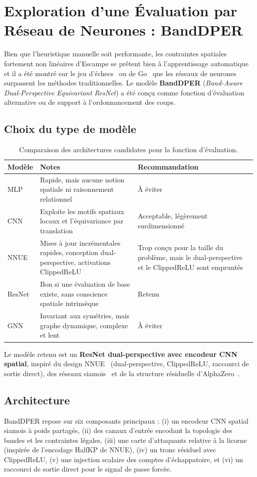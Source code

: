 \documentclass[12pt,a4paper]{article}
\begin{document}
\section{Exploration d'une Évaluation par Réseau de Neurones : BandDPER}
Bien que l'heuristique manuelle soit performante, les contraintes spatiales fortement non linéaires d'Escampe se prêtent bien à l'apprentissage automatique et il a été montré sur le jeu d'échecs~\cite{cp_nnue} ou de Go~\cite{alphazero} que les réseaux de neurones surpassent les méthodes traditionnelles.
Le modèle \textbf{BandDPER} (\textit{Band-Aware Dual-Perspective Equivariant ResNet}) a été conçu comme fonction d'évaluation alternative ou de support à l'ordonnancement des coups.


\subsection*{Choix du type de modèle}
\begin{table}[H]
\centering
\begin{tabular}{p{1.8cm} p{6.5cm} p{4.5cm}}
\toprule
Modèle & Notes & Recommandation \\
\midrule
MLP & Rapide, mais aucune notion spatiale ni raisonnement relationnel & À éviter \\
CNN & Exploite les motifs spatiaux locaux et l'équivariance par translation & Acceptable, légèrement surdimensionné \\
NNUE & Mises à jour incrémentales rapides, conception dual-perspective, activations ClippedReLU & Trop conçu pour la taille du problème, mais le dual-perspective et le ClippedReLU sont empruntés \\
ResNet & Bon si une évaluation de base existe, sans conscience spatiale intrinsèque & Retenu \\
GNN & Invariant aux symétries, mais graphe dynamique, complexe et lent & À éviter \\
\bottomrule
\end{tabular}
\caption{Comparaison des architectures candidates pour la fonction d'évaluation.}
\label{tab-existing-models}
\end{table}

Le modèle retenu est un \textbf{ResNet dual-perspective avec encodeur CNN spatial}, inspiré du design NNUE~\cite{cp_nnue} (dual-perspective, ClippedReLU, raccourci de sortie direct), des réseaux siamois~\cite{bromley1993} et de la structure résiduelle d'AlphaZero~\cite{alphazero_net}.


\subsection*{Architecture}
BandDPER repose sur six composants principaux : (i) un encodeur CNN spatial siamois à poids partagés, (ii) des canaux d'entrée encodant la topologie des bandes et les contraintes légales, (iii) une carte d'attaquants relative à la licorne (inspirée de l'encodage HalfKP de NNUE), (iv) un tronc résiduel avec ClippedReLU, (v) une injection scalaire des comptes d'échappatoire, et (vi) un raccourci de sortie direct pour le signal de passe forcée.
\end{document}
